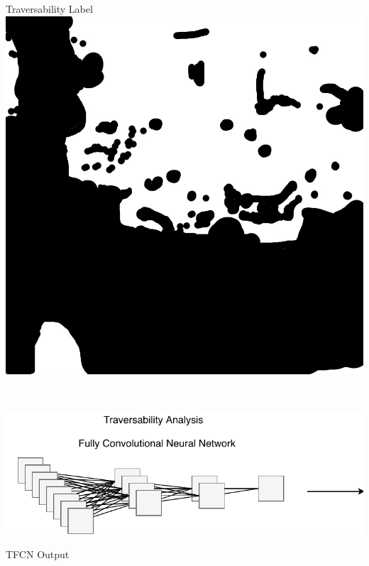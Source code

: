 \documentclass[usenames,dvipsnames,10pt]{beamer}
\begin{document}
\begin{frame}
\begin{minipage}[]{0.3\textwidth}
\end{minipage}
\hspace{0.25cm}
\begin{minipage}[]{0.3\textwidth}
	\centering
	Traversability Label
	\includegraphics[width=\textwidth]{graphics/aerial05-trav.jpg}
\end{minipage} \\
\vspace{0.25cm}
\begin{minipage}[]{0.666\textwidth}
	\includegraphics[width=\textwidth]{graphics/tfcn2.pdf}
\end{minipage}
\begin{minipage}[]{0.3\textwidth}
	\centering
	TFCN Output

\end{minipage}
\end{frame}
\end{document}
